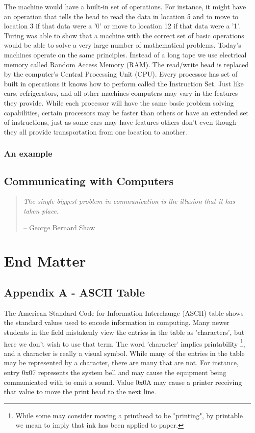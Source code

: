 \documentclass[11pt,fleqn]{book} %
\begin{document}
The machine would have a built-in set of operations.  For instance, it might have an operation that tells the head to read the data in location 5 and to move to location 3 if that data were a '0' or move to location 12 if that data were a '1'.  Turing was able to show that a machine with the correct set of basic operations would be able to solve a very large number of mathematical problems.  Today's machines operate on the same principles.  Instead of a long tape we use electrical memory called Random Access Memory (RAM).  The read/write head is replaced by the computer's Central Processing Unit (CPU).  Every processor has set of built in operations it knows how to perform called the Instruction Set.  Just like cars, refrigerators, and all other machines computers may vary in the features they provide.  While each processor will have the same basic problem solving capabilities, certain processors may be faster than others or have an extended set of instructions, just as some cars may have features others don't even though they all provide transportation from one location to another. 

\section{An example}

\chapter{Communicating with Computers}
\begin{quote}
\textit{The single biggest problem in communication is the illusion that it has taken place.}

-- George Bernard Shaw
\end{quote}

\part{End Matter}
\chapter*{Appendix A - ASCII Table}
\newcommand*{\thead}[1]{\multicolumn{1}{c}{\bfseries #1}}

The American Standard Code for Information Interchange (ASCII) table shows the standard values used to encode information in computing.  Many newer students in the field mistakenly view the entries in the table as 'characters', but here we don't wish to use that term.  The word 'character' implies printability \footnote{While some may consider moving a printhead to be "printing", by printable we mean to imply that ink has been applied to paper.}, and a character is really a visual symbol.  While many of the entries in the table may be represented by a character, there are many that are not.  For instance, entry 0x07 represents the system bell and may cause the equipment being communicated with to emit a sound.  Value 0x0A may cause a printer receiving that value to move the print head to the next line.
\end{document}
